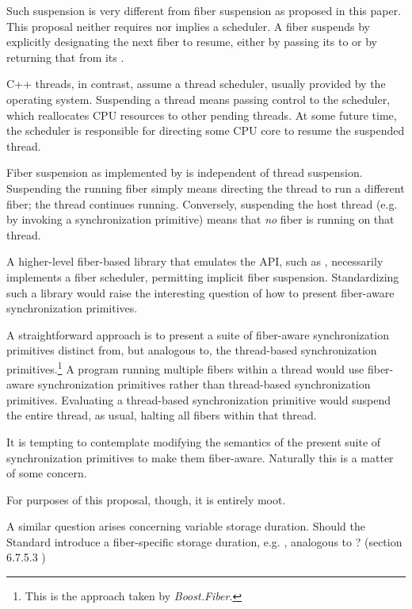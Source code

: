 Such suspension is very different from fiber suspension as proposed in this
paper. This proposal neither requires nor implies a scheduler. A fiber
suspends by explicitly designating the next fiber to resume, either by passing
its \fiber to \resumewith or by returning that \fiber from its \entryfn.

C++ threads, in contrast, assume a thread scheduler, usually provided by the
operating system. Suspending a thread means passing control to the scheduler,
which reallocates CPU resources to other pending threads. At some future time,
the scheduler is responsible for directing some CPU core to resume the suspended
thread.

Fiber suspension as implemented by \fiber is independent of thread suspension.
Suspending the running fiber simply means directing the thread to run a
different fiber; the thread continues running. Conversely, suspending the host
thread (e.g. by invoking a synchronization primitive) means that \emph{no}
fiber is running on that thread.

A higher-level fiber-based library that emulates the  API,
such as \bfiber\cite{bfiber}, necessarily implements a fiber scheduler,
permitting implicit fiber suspension. Standardizing such a library would raise
the interesting question of how to present fiber-aware synchronization
primitives.

A straightforward approach is to present a suite of fiber-aware
synchronization primitives distinct from, but analogous to, the thread-based
synchronization primitives.\footnote{This is the approach taken
by \emph{Boost.Fiber}.} A program running multiple fibers within a thread
would use fiber-aware synchronization primitives rather than thread-based
synchronization primitives. Evaluating a thread-based synchronization
primitive would suspend the entire thread, as usual, halting all fibers within
that thread.

It is tempting to contemplate modifying the semantics of the present suite of
synchronization primitives to make them fiber-aware. Naturally this is a
matter of some concern.

For purposes of this \fiber proposal, though, it is entirely moot.


A similar question arises concerning variable storage duration. Should the
Standard introduce a fiber-specific storage duration, e.g. ,
analogous to \cite{Standard}? (section 6.7.5.3 )

